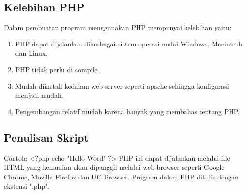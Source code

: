 \subsection{Kelebihan PHP}
Dalam pembuatan program menggunakan PHP mempunyai kelebihan yaitu:
\begin{enumerate}
\item PHP dapat dijalankan diberbagai sistem operasi mulai Windows, Macintosh dan Linux.
\item PHP tidak perlu di compile
\item Mudah diinstall kedalam web server seperti apache sehingga konfigurasi menjadi mudah.
\item Pengembangan relatif mudah karena banyak yang membahas tentang PHP.
\end{enumerate}

\subsection{Penulisan Skript}
Contoh:
<?php
 echo "Hello Word"
?>
PHP ini dapat dijalankan melalui file HTML yang kemudian akan dipanggil melalui web browser seperti Google Chrome, Mozilla Firefox dan UC Browser.
Program dalam PHP ditulis dengan ekstensi ".php". 